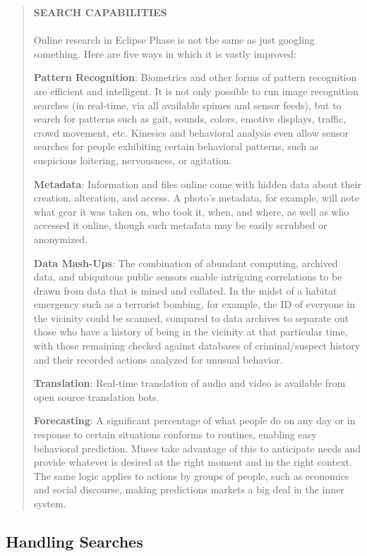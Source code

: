 \begin{quotation}
\textbf{SEARCH CAPABILITIES}
\\
\\
Online research in Eclipse Phase is not the same
as just googling something. Here are five ways in
which it is vastly improved:

\textbf{Pattern Recognition}: Biometrics and other forms
of pattern recognition are efficient and intelligent.
It is not only possible to run image recognition
searches (in real-time, via all available spimes
and sensor feeds), but to search for patterns such
as gait, sounds, colors, emotive displays, traffic,
crowd movement, etc. Kinesics and behavioral
analysis even allow sensor searches for people
exhibiting certain behavioral patterns, such as suspicious
loitering, nervousness, or agitation.

\textbf{Metadata}: Information and files online come
with hidden data about their creation, alteration,
and access. A photo’s metadata, for example,
will note what gear it was taken on, who took
it, when, and where, as well as who accessed it
online, though such metadata may be easily
scrubbed or anonymized.

\textbf{Data Mash-Ups}: The combination of abundant
computing, archived data, and ubiquitous public
sensors enable intriguing correlations to be
drawn from data that is mined and collated. In
the midst of a habitat emergency such as a terrorist
bombing, for example, the ID of everyone
in the vicinity could be scanned, compared to
data archives to separate out those who have a
history of being in the vicinity at that particular
time, with those remaining checked against
databases of criminal/suspect history and their
recorded actions analyzed for unusual behavior.

\textbf{Translation}: Real-time translation of audio and
video is available from open source translation bots.

\textbf{Forecasting}: A significant percentage of what
people do on any day or in response to certain situations
conforms to routines, enabling easy behavioral
prediction. Muses take advantage of this to
anticipate needs and provide whatever is desired
at the right moment and in the right context. The
same logic applies to actions by groups of people,
such as economics and social discourse, making predictions
markets a big deal in the inner system.
\end{quotation}

\subsection{Handling Searches}

